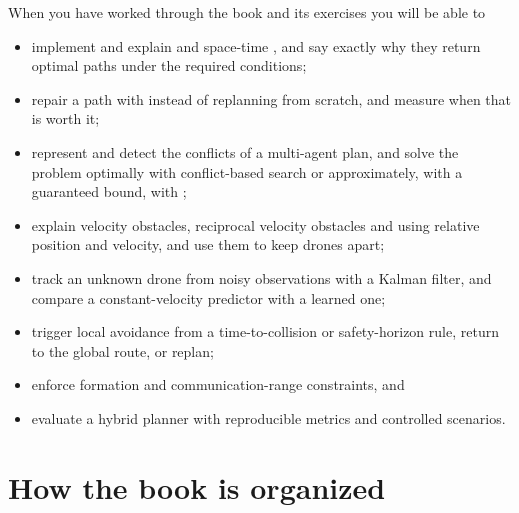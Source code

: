When you have worked through the book and its exercises you will be able to
\begin{itemize}
  \item implement and explain \astar and space-time \astar, and say exactly why they
        return optimal paths under the required conditions;
  \item repair a path with \dstarlite instead of replanning from scratch, and measure
        when that is worth it;
  \item represent and detect the conflicts of a multi-agent plan, and solve the
        problem optimally with conflict-based search or approximately, with a
        guaranteed bound, with \ecbs;
  \item explain velocity obstacles, reciprocal velocity obstacles and \orca using
        relative position and velocity, and use them to keep drones apart;
  \item track an unknown drone from noisy observations with a Kalman filter, and
        compare a constant-velocity predictor with a learned one;
  \item trigger local avoidance from a time-to-collision or safety-horizon rule, return
        to the global route, or replan;
  \item enforce formation and communication-range constraints, and
  \item evaluate a hybrid planner with reproducible metrics and controlled scenarios.
\end{itemize}

\section*{How the book is organized}

